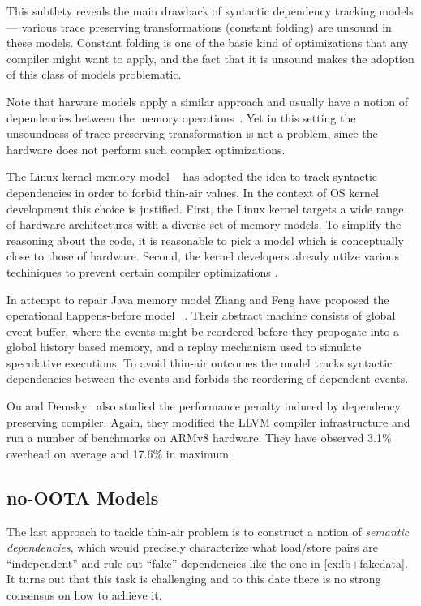 This subtlety reveals the main drawback of 
syntactic dependency tracking models --- 
various trace preserving transformations
(\eg constant folding) are unsound in these models. 
Constant folding is one of the basic kind of optimizations that 
any compiler might want to apply, 
and the fact that it is unsound  
makes the adoption of this class of models problematic.

Note that harware models apply a similar approach 
and usually have a notion of dependencies between 
the memory operations~\cite{Sarkar-al:PLDI11, Alglave-al:TOPLAS14, Pulte-al:POPL18}.
Yet in this setting the unsoundness of 
trace preserving transformation is not a problem,
since the hardware does not perform such complex optimizations.

The Linux kernel memory model \LKMM~\cite{Alglave-al:ASPLOS18} has adopted 
the idea to track syntactic dependencies in order to 
forbid thin-air values. In the context of OS kernel development 
this choice is justified. First, the Linux kernel targets 
a wide range of hardware architectures with a diverse
set of memory models. To simplify the reasoning about the code, 
it is reasonable to pick a model which is conceptually close
to those of hardware. Second, the kernel developers 
already utilze various techiniques to prevent 
certain compiler optimizations%
\cite{Alglave-al:ASPLOS18, LK-MemBarriers, LK-RCU-Deref}.

In attempt to repair Java memory model Zhang and Feng have proposed the 
operational happens-before model \OHMM~\cite{Zhang-Feng:FCS16}.
Their abstract machine consists of global event buffer,
where the events might be reordered before they propogate into  
a global history based memory, and a replay mechanism 
used to simulate speculative executions. 
To avoid thin-air outcomes the model tracks syntactic dependencies 
between the events and forbids the reordering of dependent events. 

Ou and Demsky~\cite{Ou-Demsky:OOPSLA18} also studied 
the performance penalty induced by dependency preserving compiler. 
Again, they modified the LLVM compiler infrastructure 
and run a number of benchmarks on ARMv8 hardware. 
They have observed 3.1\% overhead on average and 17.6\% in maximum. 

\subsection{no-OOTA Models}
\label{sec:prm-cert}

The last approach to tackle thin-air problem is to   
construct a notion of \emph{semantic dependencies}, 
which would precisely characterize what load/store 
pairs are ``independent'' and rule out 
``fake'' dependencies like the one in \ref{ex:lb+fakedata}.
It turns out that this task is challenging 
and to this date there is no strong consensus on how to achieve it.

